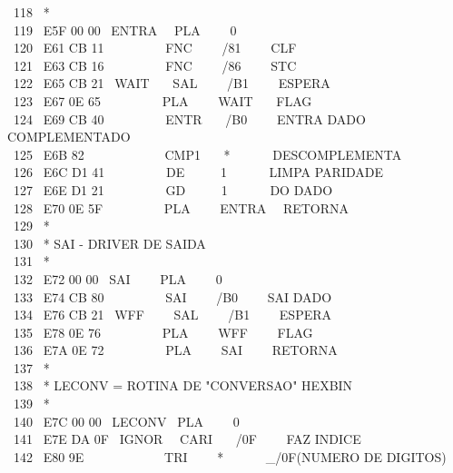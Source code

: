 \documentclass[a4paper,12pt]{article}
\begin{document}
\newpage

\noindent \ 118 \ *\\
\phantom \ 119 \ E5F 00 00 \ ENTRA \ \ PLA \ \ \ \ 0\\
\phantom \ 120 \ E61 CB 11 \ \ \ \ \ \ \ \ \ FNC \ \ \ \ /81 \ \ \ \ CLF\\
\phantom \ 121 \ E63 CB 16 \ \ \ \ \ \ \ \ \ FNC \ \ \ \ /86 \ \ \ \ STC\\
\phantom \ 122 \ E65 CB 21 \ WAIT \ \ \ SAL \ \ \ \ /B1 \ \ \ \ ESPERA\\
\phantom \ 123 \ E67 0E 65 \ \ \ \ \ \ \ \ \ PLA \ \ \ \ WAIT \ \ \ FLAG\\
\phantom \ 124 \ E69 CB 40 \ \ \ \ \ \ \ \ \ ENTR \ \ \ /B0 \ \ \ \ ENTRA DADO COMPLEMENTADO\\
\phantom \ 125 \ E6B 82 \ \ \ \ \ \ \ \ \ \ \ \ CMP1 \ \ \ * \ \ \ \ \ \ DESCOMPLEMENTA\\
\phantom \ 126 \ E6C D1 41 \ \ \ \ \ \ \ \ \ DE \ \ \ \ \ 1 \ \ \ \ \ \ LIMPA PARIDADE\\
\phantom \ 127 \ E6E D1 21 \ \ \ \ \ \ \ \ \ GD \ \ \ \ \ 1 \ \ \ \ \ \ DO DADO\\
\phantom \ 128 \ E70 0E 5F \ \ \ \ \ \ \ \ \ PLA \ \ \ \ ENTRA \ \ RETORNA\\
\phantom \ 129 \ *\\
\phantom \ 130 \ * SAI - DRIVER DE SAIDA\\
\phantom \ 131 \ *\\
\phantom \ 132 \ E72 00 00 \ SAI \ \ \ \ PLA \ \ \ \ 0\\
\phantom \ 133 \ E74 CB 80 \ \ \ \ \ \ \ \ \ SAI \ \ \ \ /B0 \ \ \ \ SAI DADO\\
\phantom \ 134 \ E76 CB 21 \ WFF \ \ \ \ SAL \ \ \ \ /B1 \ \ \ \ ESPERA\\
\phantom \ 135 \ E78 0E 76 \ \ \ \ \ \ \ \ \ PLA \ \ \ \ WFF \ \ \ \ FLAG\\
\phantom \ 136 \ E7A 0E 72 \ \ \ \ \ \ \ \ \ PLA \ \ \ \ SAI \ \ \ \ RETORNA\\
\phantom \ 137 \ *\\
\phantom \ 138 \ * LECONV = ROTINA DE "CONVERSAO" HEXBIN\\
\phantom \ 139 \ *\\
\phantom \ 140 \ E7C 00 00 \ LECONV \ PLA \ \ \ \ 0\\
\phantom \ 141 \ E7E DA 0F \ IGNOR \ \ CARI \ \ \ /0F \ \ \ \ FAZ INDICE\\
\phantom \ 142 \ E80 9E \ \ \ \ \ \ \ \ \ \ \ \ TRI \ \ \ \ * \ \ \ \ \ \ \_/0F(NUMERO DE DIGITOS)\\
\end{document}
